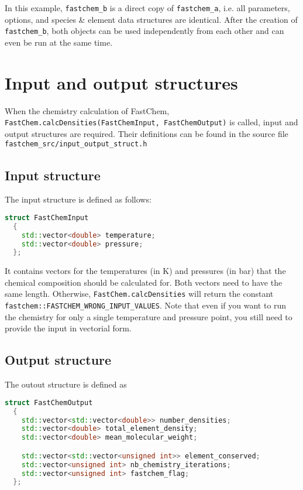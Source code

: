 \documentclass[numbers=noenddot]{fcmanual}
\begin{document}
In this example, \lstinline!fastchem_b! is a direct copy of \lstinline!fastchem_a!, i.e. all parameters, options, and species \& element data structures are identical. After the creation of \lstinline!fastchem_b!, both objects can be used independently from each other and can even be run at the same time. 



\section{Input and output structures}

When the chemistry calculation of FastChem, \lstinline!FastChem.calcDensities(FastChemInput, FastChemOutput)! is called, input and output structures are required. Their definitions can be found in the source file \verb|fastchem_src/input_output_struct.h|

\subsection{Input structure}
\label{sec:fastchem_input_struct}
The input structure is defined as follows:
\begin{lstlisting}[language=C++]
  struct FastChemInput
  {
    std::vector<double> temperature; 
    std::vector<double> pressure;
  };
\end{lstlisting}

It contains vectors for the temperatures (in K) and pressures (in bar) that the chemical composition should be calculated for. Both vectors need to have the same length. Otherwise, \lstinline!FastChem.calcDensities! will return the constant \lstinline!fastchem::FASTCHEM_WRONG_INPUT_VALUES!. Note that even if you want to run the chemistry for only a single temperature and pressure point, you still need to provide the input in vectorial form.


\subsection{Output structure}

The outout structure is defined as
\begin{lstlisting}[language=C++]
  struct FastChemOutput
  {
    std::vector<std::vector<double>> number_densities;
    std::vector<double> total_element_density;
    std::vector<double> mean_molecular_weight;

    std::vector<std::vector<unsigned int>> element_conserved;
    std::vector<unsigned int> nb_chemistry_iterations;
    std::vector<unsigned int> fastchem_flag;
  };
\end{lstlisting}
\end{document}

